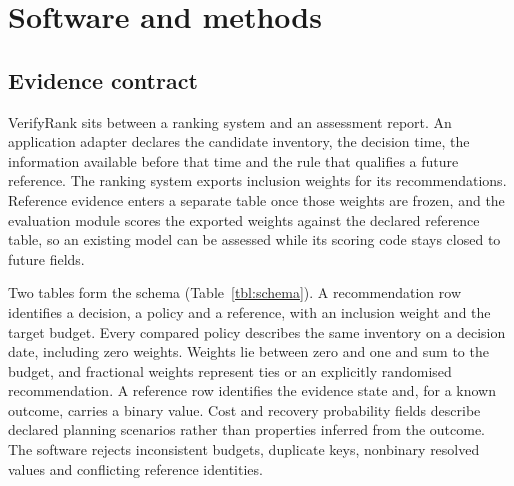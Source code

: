 \documentclass[a4paper,fleqn,longmktitle]{cas-sc}
\begin{document}
\section{Software and methods}\label{sec:methods}

\subsection{Evidence contract}\label{sec:contract}

VerifyRank sits between a ranking system and an assessment report. An application adapter declares the candidate inventory, the decision time, the information available before that time and the rule that qualifies a future reference. The ranking system exports inclusion weights for its recommendations. Reference evidence enters a separate table once those weights are frozen, and the evaluation module scores the exported weights against the declared reference table, so an existing model can be assessed while its scoring code stays closed to future fields.

Two tables form the schema (Table~\ref{tbl:schema}). A recommendation row identifies a decision, a policy and a reference, with an inclusion weight and the target budget. Every compared policy describes the same inventory on a decision date, including zero weights. Weights lie between zero and one and sum to the budget, and fractional weights represent ties or an explicitly randomised recommendation. A reference row identifies the evidence state and, for a known outcome, carries a binary value. Cost and recovery probability fields describe declared planning scenarios rather than properties inferred from the outcome. The software rejects inconsistent budgets, duplicate keys, nonbinary resolved values and conflicting reference identities.
\end{document}
